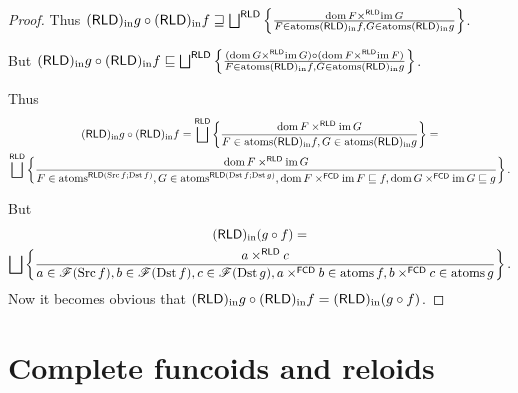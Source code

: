 \begin{proof}
Thus $\torldin g\circ\torldin f\sqsupseteq\bigsqcup^{\mathsf{RLD}}\setcond{\dom F\times^{\mathsf{RLD}}\im G}{F\in\atoms\torldin f,G\in\atoms\torldin g}$.

But $\torldin g\circ\torldin f\sqsubseteq\bigsqcup^{\mathsf{RLD}}\setcond{(\dom G\times^{\mathsf{RLD}}\im G)\circ(\dom F\times^{\mathsf{RLD}}\im F)}{F\in\atoms\torldin f,G\in\atoms\torldin g}$.

Thus 
\begin{multline*}
\torldin g\circ\torldin f=\bigsqcup^{\mathsf{RLD}}\setcond{\dom F\times^{\mathsf{RLD}}\im G}{F\in\atoms\torldin f,G\in\atoms\torldin g}=\\
\bigsqcup^{\mathsf{RLD}}\setcond{\dom F\times^{\mathsf{RLD}}\im G}{F\in\atoms^{\mathsf{RLD}(\Src f;\Dst f)},G\in\atoms^{\mathsf{RLD}(\Dst f;\Dst g)},\dom F\times^{\mathsf{FCD}}\im F\sqsubseteq f,\dom G\times^{\mathsf{FCD}}\im G\sqsubseteq g}.
\end{multline*}


But 
\begin{multline*}
\torldin(g\circ f)=\\
\bigsqcup\setcond{a\times^{\mathsf{RLD}}c}{a\in\mathscr{F}(\Src f),b\in\mathscr{F}(\Dst f),c\in\mathscr{F}(\Dst g),a\times^{\mathsf{FCD}}b\in\atoms f,b\times^{\mathsf{FCD}}c\in\atoms g}.
\end{multline*}
Now it becomes obvious that $\torldin g\circ\torldin f=\torldin(g\circ f)$.
\end{proof}

\section{Complete funcoids and reloids}

